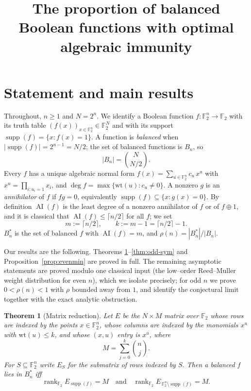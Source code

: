 \documentclass{amsart}
\newtheorem{theorem}{Theorem}
\theoremstyle{definition}
\DeclareMathOperator{\AI}{AI}
\DeclareMathOperator{\supp}{supp}
\DeclareMathOperator{\rank}{rank}
\newcommand{\F}{\mathbb{F}}
\begin{document}
\title{The proportion of balanced Boolean functions with optimal algebraic immunity}
\maketitle

\section{Statement and main results}

Throughout, $n\ge 1$ and $N=2^{n}$. We identify a Boolean function
$f:\F_2^n\to\F_2$ with its truth table $(f(x))_{x\in\F_2^n}\in\F_2^{N}$
and with its support $\supp(f)=\{x: f(x)=1\}$. A function is
\emph{balanced} when $|\supp(f)|=2^{n-1}=N/2$; the set of balanced
functions is $B_n$, so
\begin{equation}\label{eq:Bn}
|B_n|=\binom{N}{N/2}.
\end{equation}
Every $f$ has a unique algebraic normal form
$f(x)=\sum_{u\in\F_2^n}c_u\,x^{u}$ with $x^{u}=\prod_{i:u_i=1}x_i$, and
$\deg f=\max\{\mathrm{wt}(u):c_u\ne0\}$. A nonzero $g$ is an
\emph{annihilator} of $f$ if $fg=0$, equivalently
$\supp(f)\subseteq\{x:g(x)=0\}$. By definition $\AI(f)$ is the least
degree of a nonzero annihilator of $f$ or of $f\oplus 1$, and it is
classical that $\AI(f)\le\lceil n/2\rceil$ for all $f$; we set
\[
m:=\lceil n/2\rceil,\qquad k:=m-1=\lceil n/2\rceil-1 .
\]
$B_n^*$ is the set of balanced $f$ with $\AI(f)=m$, and
$\rho(n)=|B_n^*|/|B_n|$.

\medskip
Our results are the following. Theorems
\ref{thm:reduction}--\ref{thm:odd-sym} and
Proposition~\ref{prop:evenmin} are proved in full. The remaining
asymptotic statements are proved modulo one classical input (the
low--order Reed--Muller weight distribution for even $n$), which we
isolate precisely; for odd $n$ we prove $0<\rho(n)<1$ with $\rho$ bounded
away from $1$, and identify the conjectural limit together with the exact
analytic obstruction.

\begin{theorem}[Matrix reduction]\label{thm:reduction}
Let $E$ be the $N\times M$ matrix over $\F_2$ whose rows are indexed by the
points $x\in\F_2^n$, whose columns are indexed by the monomials $x^{u}$
with $\mathrm{wt}(u)\le k$, and whose $(x,u)$ entry is $x^{u}$, where
\begin{equation}\label{eq:M}
M=\sum_{j=0}^{k}\binom nj .
\end{equation}
For $S\subseteq\F_2^n$ write $E_S$ for the submatrix of rows indexed by
$S$. Then a balanced $f$ lies in $B_n^*$ iff
\[
\rank_{\F_2}E_{\supp(f)}=M\quad\text{and}\quad
\rank_{\F_2}E_{\,\F_2^n\setminus\supp(f)}=M .
\]
\end{theorem}
\end{document}
